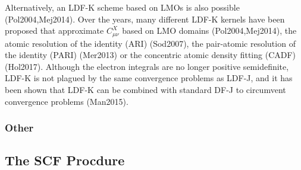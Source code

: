 \noindent Alternatively, an LDF-K scheme based on LMOs is also possible (Pol2004,Mej2014). Over the years, many different LDF-K kernels have been proposed that approximate $C_{\mu\nu}^X$ based on LMO domains (Pol2004,Mej2014), the atomic resolution of the identity (ARI) (Sod2007), the pair-atomic resolution of the identity (PARI) (Mer2013) or the concentric atomic density fitting (CADF) (Hol2017). Although the electron integrals are no longer positive semidefinite, LDF-K is not plagued by the same convergence problems as LDF-J, and it has been shown that LDF-K can be combined with standard DF-J to circumvent convergence problems (Man2015). 


\subsubsection{Other}


\subsection{The SCF Procdure}

